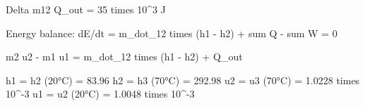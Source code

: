 Delta m12  
Q_out = 35 times 10^3 J  

Energy balance:  
dE/dt = m_dot_12 times (h1 - h2) + sum Q - sum W = 0  

m2 u2 - m1 u1 = m_dot_12 times (h1 - h2) + Q_out  

h1 = h2 (20°C) = 83.96  
h2 = h3 (70°C) = 292.98  
u2 = u3 (70°C) = 1.0228 times 10^-3  
u1 = u2 (20°C) = 1.0048 times 10^-3